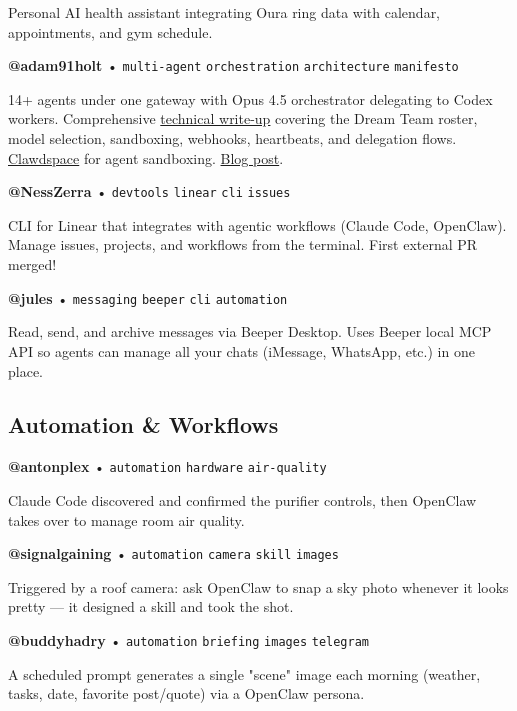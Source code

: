 Personal AI health assistant integrating Oura ring data with calendar, appointments, and gym schedule.

\textbf{@adam91holt} • \texttt{multi-agent} \texttt{orchestration} \texttt{architecture} \texttt{manifesto}

14+ agents under one gateway with Opus 4.5 orchestrator delegating to Codex workers. Comprehensive \href{https://github.com/adam91holt/orchestrated-ai-articles}{technical write-up} covering the Dream Team roster, model selection, sandboxing, webhooks, heartbeats, and delegation flows. \href{https://github.com/adam91holt/clawdspace}{Clawdspace} for agent sandboxing. \href{https://adams-ai-journey.ghost.io/2026-the-year-of-the-orchestrator/}{Blog post}.

\textbf{@NessZerra} • \texttt{devtools} \texttt{linear} \texttt{cli} \texttt{issues}

CLI for Linear that integrates with agentic workflows (Claude Code, OpenClaw). Manage issues, projects, and workflows from the terminal. First external PR merged!

\textbf{@jules} • \texttt{messaging} \texttt{beeper} \texttt{cli} \texttt{automation}

Read, send, and archive messages via Beeper Desktop. Uses Beeper local MCP API so agents can manage all your chats (iMessage, WhatsApp, etc.) in one place.


\subsection{Automation \& Workflows}



\textbf{@antonplex} • \texttt{automation} \texttt{hardware} \texttt{air-quality}

Claude Code discovered and confirmed the purifier controls, then OpenClaw takes over to manage room air quality.


\textbf{@signalgaining} • \texttt{automation} \texttt{camera} \texttt{skill} \texttt{images}

Triggered by a roof camera: ask OpenClaw to snap a sky photo whenever it looks pretty — it designed a skill and took the shot.


\textbf{@buddyhadry} • \texttt{automation} \texttt{briefing} \texttt{images} \texttt{telegram}

A scheduled prompt generates a single "scene" image each morning (weather, tasks, date, favorite post/quote) via a OpenClaw persona.

